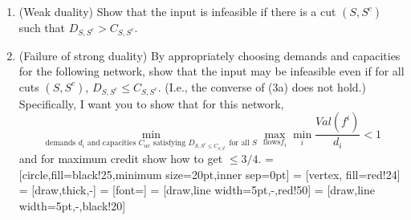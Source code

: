 \documentclass{article}
\begin{document}
\begin{enumerate}[label= (\alph*)]
      \item (Weak duality) Show that the input is infeasible if there is a cut \((S,
            S^c)\) such that \(D_{S,S^c} > C_{S,S^c}\).
      \item (Failure of strong duality) By appropriately choosing demands and capacities
            for the following network, show that the input may be infeasible even if for all
            cuts \((S,S^c)\), \(D_{S,S^c} \leq C_{S,S^c}\). (I.e., the converse of (3a) does not
            hold.)
            Specifically, I want you to show that for this network, \[\min_{\text{demands } d_i
                        \text{ and capacities } C_{uv} \text{ satisfying } D_{S,S^c \leq C_{S,S^c}}
                        \text{ for all } S} \max_{\text{flows} f_i} \min_{i}
                  \frac{Val(f^i)}{d_i} < 1\] and for maximum credit show how to get \(\leq 3/4\).
            =[circle,fill=black!25,minimum size=20pt,inner sep=0pt]
             = [vertex, fill=red!24]
             = [draw,thick,-]
             = [font=\small]
             = [draw,line width=5pt,-,red!50]
             = [draw,line width=5pt,-,black!20]
            \paragraph{}
\end{enumerate}
\end{document}
